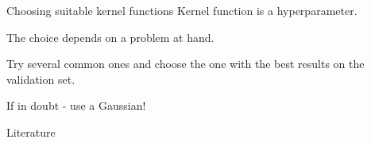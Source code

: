 \documentclass[dvipsnames]{beamer}
\begin{document}
			\begin{frame}{Choosing suitable kernel functions}
				Kernel function is a hyperparameter. \pause
				
				The choice depends on a problem at hand. \pause
				
				Try several common ones and choose the one with the best results on the validation set. \pause
				
				If in doubt - use a Gaussian!
			\end{frame}
			
			 \begin{frame}{Literature}
    \printbibliography
  \end{frame}
			
\end{document}
